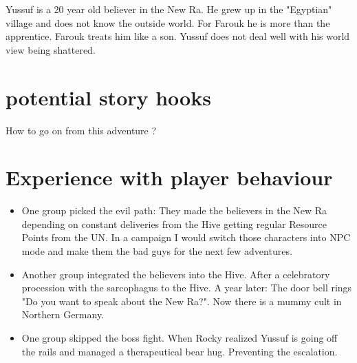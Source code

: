 \begin{npcBox}[title=Leo]
    \begin{consequences}
    \item {}
    \item {}
    \item {}
    \end{consequences}

    \begin{npcDescription}
    Yussuf is a 20 year old believer in the New Ra. He grew up in the "Egyptian" village and does not know the outside world. For Farouk he is more than the apprentice. Farouk treats him like a son. Yussuf does not deal well with his world view being shattered.
    \end{npcDescription}

\end{npcBox}













\section{potential story hooks}

How to go on from this adventure ?

\section{Experience with player behaviour}

\begin{itemize}
    \item One group picked the evil path: They made the believers in the New Ra depending on constant deliveries from the Hive getting regular Resource Points from the UN. In a campaign I would switch those characters into NPC mode and make them the bad guys for the next few adventures.
    \item Another group integrated the believers into the Hive. After a celebratory procession with the sarcophagus to the Hive. A year later: The door bell rings "Do you want to speak about the New Ra?". Now there is a mummy cult in Northern Germany.
    \item One group skipped the boss fight. When Rocky realized Yussuf is going off the rails and managed a therapeutical bear hug. Preventing the escalation.
\end{itemize}


